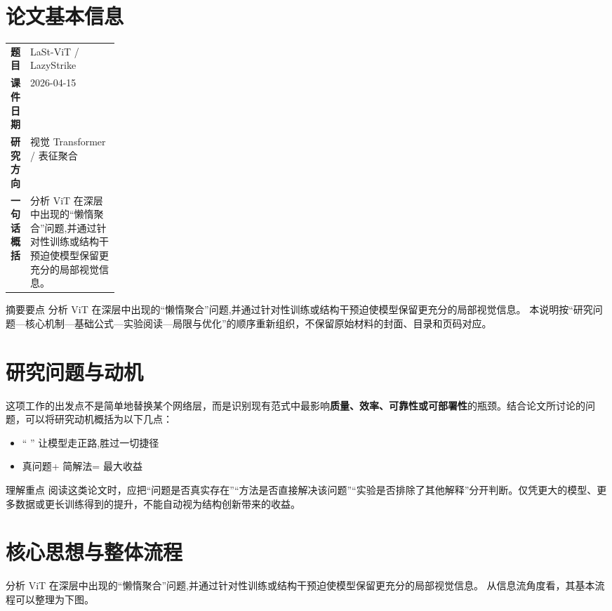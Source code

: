\documentclass[UTF8,11pt,a4paper]{ctexart}
\newcommand{\term}[1]{\textbf{\textcolor{mainblue}{#1}}}
\begin{document}
\section{论文基本信息}
\begin{center}
\begin{tabularx}{0.94\linewidth}{>{\bfseries}p{0.18\linewidth}X}
\toprule
题目 & LaSt-ViT / LazyStrike\\
课件日期 & 2026-04-15\\
研究方向 & 视觉 Transformer / 表征聚合\\
一句话概括 & 分析 ViT 在深层中出现的“懒惰聚合”问题,并通过针对性训练或结构干预迫使模型保留更充分的局部视觉信息。\\
\bottomrule
\end{tabularx}
\end{center}

\begin{infobox}{摘要要点}
分析 ViT 在深层中出现的“懒惰聚合”问题,并通过针对性训练或结构干预迫使模型保留更充分的局部视觉信息。 本说明按“研究问题—核心机制—基础公式—实验阅读—局限与优化”的顺序重新组织，不保留原始材料的封面、目录和页码对应。
\end{infobox}

\section{研究问题与动机}
这项工作的出发点不是简单地替换某个网络层，而是识别现有范式中最影响\term{质量、效率、可靠性或可部署性}的瓶颈。结合论文所讨论的问题，可以将研究动机概括为以下几点：
\begin{itemize}
\item “ ” 让模型走正路,胜过一切捷径
\item 真问题+ 简解法= 最大收益
\end{itemize}

\begin{notebox}{理解重点}
阅读这类论文时，应把“问题是否真实存在”“方法是否直接解决该问题”“实验是否排除了其他解释”分开判断。仅凭更大的模型、更多数据或更长训练得到的提升，不能自动视为结构创新带来的收益。
\end{notebox}

\section{核心思想与整体流程}
分析 ViT 在深层中出现的“懒惰聚合”问题,并通过针对性训练或结构干预迫使模型保留更充分的局部视觉信息。 从信息流角度看，其基本流程可以整理为下图。
\end{document}
